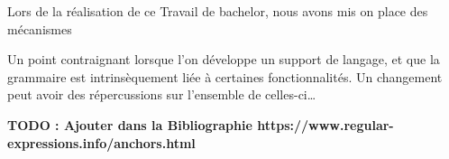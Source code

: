 \documentclass[
    iict, %
    il, %
]{heig-tb}
\begin{document}
Lors de la réalisation de ce Travail de bachelor, nous avons mis on place des mécanismes

Un point contraignant lorsque l'on développe un support de langage, et que la grammaire est intrinsèquement liée à certaines fonctionnalités.
Un changement peut avoir des répercussions sur l'ensemble de celles-ci\dots




\label{glossaire}
\printnoidxglossary
{}

\textbf{TODO : Ajouter dans la Bibliographie https://www.regular-expressions.info/anchors.html}
\printbibliography
{}

\end{document}
